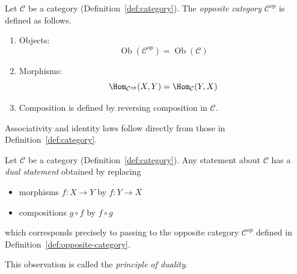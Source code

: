 \begin{definition}
\label{def:opposite-category}

Let $\mathcal{C}$ be a category (Definition~\ref{def:category}).  
The \emph{opposite category} $\mathcal{C}^{op}$ is defined as follows.

\begin{enumerate}

\item Objects:
$$
\operatorname{Ob}(\mathcal{C}^{op}) = \operatorname{Ob}(\mathcal{C})
$$

\item Morphisms:
$$
\Hom_{\mathcal{C}^{op}}(X,Y)
=
\Hom_{\mathcal{C}}(Y,X)
$$

\item Composition is defined by reversing composition in $\mathcal{C}$.

\end{enumerate}

Associativity and identity laws follow directly from those in
Definition~\ref{def:category}.
\end{definition}


\begin{remark}
\label{rmk:duality}

Let $\mathcal{C}$ be a category (Definition~\ref{def:category}).  
Any statement about $\mathcal{C}$ has a \emph{dual statement}
obtained by replacing

\begin{itemize}

\item morphisms $f : X \to Y$ by $f : Y \to X$

\item compositions $g \circ f$ by $f \circ g$

\end{itemize}

which corresponds precisely to passing to the opposite category
$\mathcal{C}^{op}$ defined in Definition~\ref{def:opposite-category}.

This observation is called the \emph{principle of duality}.
\end{remark}


